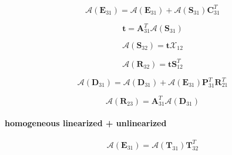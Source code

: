 \begin{equation}
\mathcal{A}(\mathbf{E}_{31}) = \mathcal{A}(\mathbf{E}_{31}) + \mathcal{A}(\mathbf{S}_{31})\mathbf{C}_{31}^{T}
\label{eq:adding-upward-adjoint_of_tangent_linear-unlinearized_p_homogeneous_linearized-E31_a3}
\end{equation}

\begin{equation}
\mathbf{t} = \mathbf{A}^{T}_{31}\mathcal{A}(\mathbf{S}_{31})
\label{eq:adding-upward-adjoint_of_tangent_linear-unlinearized_p_homogeneous_linearized-t}
\end{equation}

\begin{equation}
\mathcal{A}(\mathbf{S}_{32}) = \mathbf{t}\mathcal{X}_{12}
\label{eq:adding-upward-adjoint_of_tangent_linear-unlinearized_p_homogeneous_linearized-S32_a}
\end{equation}

\begin{equation}
\mathcal{A}(\mathbf{R}_{32}) = \mathbf{t}\mathbf{S}^{T}_{12}
\label{eq:adding-upward-adjoint_of_tangent_linear-unlinearized_p_homogeneous_linearized-R32_a}
\end{equation}

\begin{equation}
\mathcal{A}(\mathbf{D}_{31}) = \mathcal{A}(\mathbf{D}_{31}) + \mathcal{A}(\mathbf{E}_{31})\mathbf{P}^{T}_{31}\mathbf{R}^{T}_{21}
\label{eq:adding-upward-adjoint_of_tangent_linear-unlinearized_p_homogeneous_linearized-D31_a2}
\end{equation}

\begin{equation}
\mathcal{A}(\mathbf{R}_{23}) = \mathbf{A}^{T}_{31}\mathcal{A}(\mathbf{D}_{31})
\label{eq:adding-upward-adjoint_of_tangent_linear-unlinearized_p_homogeneous_linearized-R23_a}
\end{equation}


\paragraph{homogeneous linearized + unlinearized}
\label{sec:adding-upward-adjoint_of_tangent_linear-homogeneous_linearized_p_unlinearized}

\begin{equation}
\mathcal{A}(\mathbf{E}_{31}) = \mathcal{A}(\mathbf{T}_{31})\mathbf{T}^{T}_{32}
\label{eq:adding-upward-adjoint_of_tangent_linear-homogeneous_linearized_p_unlinearized-E31_a}
\end{equation}

